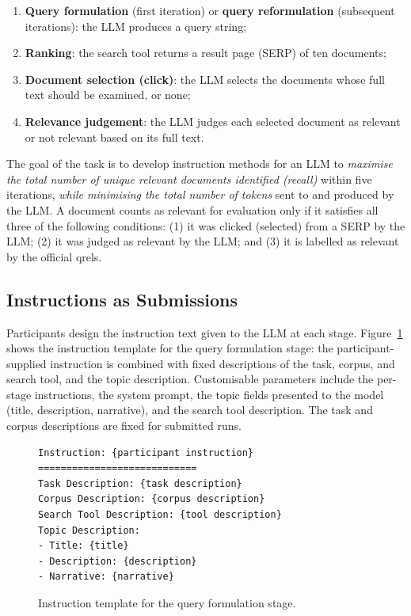 \documentclass[sigconf,article]{acmart}
\begin{document}
\begin{enumerate}
  \item \textbf{Query formulation} (first iteration) or \textbf{query
  reformulation} (subsequent iterations): the LLM produces a query string;
  \item \textbf{Ranking}: the search tool returns a result page (SERP) of ten
  documents;
  \item \textbf{Document selection (click)}: the LLM selects the documents
  whose full text should be examined, or none;
  \item \textbf{Relevance judgement}: the LLM judges each selected document as
  relevant or not relevant based on its full text.
\end{enumerate}

The goal of the task is to develop instruction methods for an LLM to
\emph{maximise the total number of unique relevant documents identified
(recall)} within five iterations, \emph{while minimising the total number of
tokens} sent to and produced by the LLM. A document counts as relevant for
evaluation only if it satisfies all three of the following conditions:
(1) it was clicked (selected) from a SERP by the LLM;
(2) it was judged as relevant by the LLM; and
(3) it is labelled as relevant by the official qrels.

\subsection{Instructions as Submissions}

Participants design the instruction text given to the LLM at each stage.
Figure~\ref{fig:template} shows the instruction template for the query
formulation stage: the participant-supplied instruction is combined with fixed
descriptions of the task, corpus, and search tool, and the topic description.
Customisable parameters include the per-stage instructions, the system prompt,
the topic fields presented to the model (title, description, narrative), and
the search tool description. The task and corpus descriptions are fixed for
submitted runs.

\begin{figure}
\begin{verbatim}
Instruction: {participant instruction}
============================
Task Description: {task description}
Corpus Description: {corpus description}
Search Tool Description: {tool description}
Topic Description:
- Title: {title}
- Description: {description}
- Narrative: {narrative}
\end{verbatim}
\caption{Instruction template for the query formulation stage.}
\label{fig:template}
\end{figure}
\end{document}
